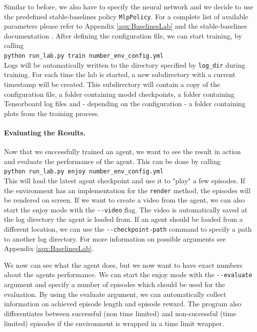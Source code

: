  Similar to before, we also have to specify the neural network and we decide to use the predefined stable-baselines policy \texttt{MlpPolicy}. For a complete list of available parameters please refer to Appendix \ref{apx:BaselinesLab} and the stable-baselines documentation \cite{stable-baselines-docs}. After defining the configuration file, we can start training, by calling \\ 

\texttt{python run\_lab.py train number\_env\_config.yml} \\ 

 \noindent Logs will be automatically written to the directory specified by \texttt{log\_dir} during training. For each time the lab is started, a new subdirectory with a current timestamp will be created. This subdirectory will contain a copy of the configuration file, a folder containing model checkpoints, a folder containing Tensorboard log files and - depending on the configuration - a folder containing plots from the training process. 

\paragraph{Evaluating the Results.}
Now that we successfully trained an agent, we want to see the result in action and evaluate the performance of the agent. This can be done by calling \\

\texttt{python run\_lab.py enjoy number\_env\_config.yml} \\

\noindent This will load the latest agent checkpoint and use it to "play" a few episodes. If the environment has an implementation for the \texttt{render} method, the episodes will be rendered on screen. If we want to create a video from the agent, we can also start the enjoy mode with the \texttt{-{}-video} flag. The video is automatically saved at the log directory the agent is loaded from. If an agent should be loaded from a different location, we can use the \texttt{-{}-checkpoint-path} command to specify a path to another log directory. For more information on possible arguments see Appendix \ref{apx:BaselinesLab}. 

We now can see what the agent does, but we now want to have exact numbers about the agents performance. We can start the enjoy mode with the \texttt{-{}-evaluate} argument and specify a number of episodes which should be used for the evaluation. By using the evaluate argument, we can automatically collect information on achieved episode length and episode reward. The program also differentiates between successful (non time limited) and non-successful (time limited) episodes if the environment is wrapped in a time limit wrapper.

